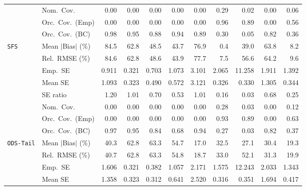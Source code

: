 \begin{landscape}
\begin{longtable}{llrrrrrrrrr}
 & Nom.\ Cov. & 0.00 & 0.00 & 0.00 & 0.00 & 0.00 & \cellcolor{rankone}0.29 & \cellcolor{rankthree}0.02 & 0.00 & \cellcolor{ranktwo}0.06 \\
 & Orc.\ Cov.\ (Emp) & 0.00 & 0.00 & 0.00 & 0.00 & 0.00 & \cellcolor{rankone}0.96 & \cellcolor{ranktwo}0.89 & 0.00 & \cellcolor{rankthree}0.56 \\
 & Orc.\ Cov.\ (BC) & \cellcolor{rankthree}0.98 & \cellcolor{rankone}0.95 & 0.88 & \cellcolor{ranktwo}0.94 & 0.89 & 0.30 & 0.05 & 0.82 & 0.36 \\
\addlinespace[2pt]
\quad \texttt{SFS} & Mean $|$Bias$|$ (\%) & 84.5 & 62.8 & 48.5 & 43.7 & 76.9 & \cellcolor{rankone}0.4 & \cellcolor{rankthree}39.0 & 63.8 & \cellcolor{ranktwo}8.2 \\
 & Rel.\ RMSE (\%) & 84.6 & 62.8 & 48.6 & \cellcolor{rankthree}43.9 & 77.7 & \cellcolor{rankone}7.5 & 56.6 & 64.2 & \cellcolor{ranktwo}9.6 \\
 & Emp.\ SE & 0.911 & 0.321 & 0.703 & 1.073 & 3.101 & 2.065 & 11.258 & 1.911 & 1.392 \\
 & Mean SE & 1.093 & 0.323 & 0.490 & 0.572 & 3.121 & 0.326 & 0.330 & 1.305 & 0.344 \\
 & SE ratio & \cellcolor{ranktwo}1.20 & \cellcolor{rankone}1.01 & \cellcolor{rankthree}0.70 & 0.53 & \cellcolor{rankone}1.01 & 0.16 & 0.03 & 0.68 & 0.25 \\
 & Nom.\ Cov. & 0.00 & 0.00 & 0.00 & 0.00 & 0.00 & \cellcolor{rankone}0.28 & \cellcolor{rankthree}0.03 & 0.00 & \cellcolor{ranktwo}0.12 \\
 & Orc.\ Cov.\ (Emp) & 0.00 & 0.00 & 0.00 & 0.00 & 0.00 & \cellcolor{rankone}0.93 & \cellcolor{ranktwo}0.89 & 0.00 & \cellcolor{rankthree}0.63 \\
 & Orc.\ Cov.\ (BC) & \cellcolor{rankthree}0.97 & \cellcolor{rankone}0.95 & 0.84 & 0.68 & \cellcolor{ranktwo}0.94 & 0.27 & 0.03 & 0.82 & 0.37 \\
\addlinespace[2pt]
\quad \texttt{ODS-Tail} & Mean $|$Bias$|$ (\%) & 40.3 & 62.8 & 63.3 & 54.7 & \cellcolor{rankone}17.0 & 32.5 & \cellcolor{rankthree}27.1 & 30.4 & \cellcolor{ranktwo}19.3 \\
 & Rel.\ RMSE (\%) & 40.7 & 62.8 & 63.3 & 54.8 & \cellcolor{rankone}18.7 & 33.0 & 52.1 & \cellcolor{rankthree}31.3 & \cellcolor{ranktwo}19.9 \\
 & Emp.\ SE & 1.606 & 0.321 & 0.382 & 1.057 & 2.171 & 1.575 & 12.243 & 2.033 & 1.343 \\
 & Mean SE & 1.358 & 0.323 & 0.312 & 0.641 & 2.520 & 0.316 & 0.351 & 1.694 & 0.417 \\

\end{longtable}
\end{landscape}
